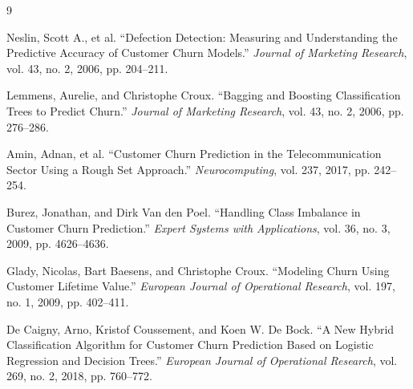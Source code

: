 \documentclass{article}
\begin{document}
\begin{thebibliography}{9}

Neslin, Scott A., et al. ``Defection Detection: Measuring and Understanding the Predictive Accuracy of Customer Churn Models.'' \emph{Journal of Marketing Research}, vol. 43, no. 2, 2006, pp. 204--211.

Lemmens, Aurelie, and Christophe Croux. ``Bagging and Boosting Classification Trees to Predict Churn.'' \emph{Journal of Marketing Research}, vol. 43, no. 2, 2006, pp. 276--286.

Amin, Adnan, et al. ``Customer Churn Prediction in the Telecommunication Sector Using a Rough Set Approach.'' \emph{Neurocomputing}, vol. 237, 2017, pp. 242--254.

Burez, Jonathan, and Dirk Van den Poel. ``Handling Class Imbalance in Customer Churn Prediction.'' \emph{Expert Systems with Applications}, vol. 36, no. 3, 2009, pp. 4626--4636.

Glady, Nicolas, Bart Baesens, and Christophe Croux. ``Modeling Churn Using Customer Lifetime Value.'' \emph{European Journal of Operational Research}, vol. 197, no. 1, 2009, pp. 402--411.

De Caigny, Arno, Kristof Coussement, and Koen W. De Bock. ``A New Hybrid Classification Algorithm for Customer Churn Prediction Based on Logistic Regression and Decision Trees.'' \emph{European Journal of Operational Research}, vol. 269, no. 2, 2018, pp. 760--772.

\end{thebibliography}
\end{document}
